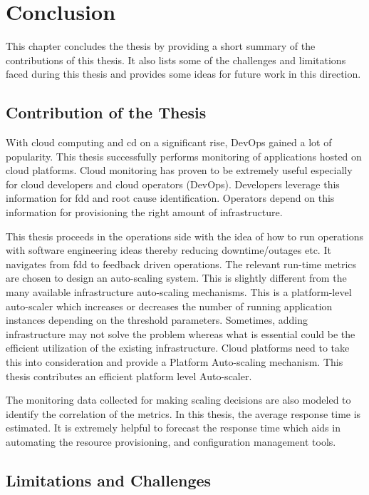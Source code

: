 \documentclass[article,type=msc,colorback,12pt,accentcolor=tud8b,table]{tudthesis}
\begin{document}
\cleardoublepage

 \hfill 
\section{Conclusion}	 
	 \hfill \break

This chapter concludes the thesis by providing a short summary of the contributions of this thesis. It also lists some of the challenges and limitations faced during this thesis and provides some ideas for future work in this direction.
 
\subsection{Contribution of the Thesis}

With cloud computing and \gls{cd} on a significant rise, DevOps gained a lot of popularity. This thesis successfully performs monitoring of applications hosted on cloud platforms. Cloud monitoring has proven to be extremely useful especially for cloud developers and cloud operators (DevOps). Developers leverage this information for \gls{fdd} and root cause identification. Operators depend on this information for provisioning the right amount of infrastructure.

This thesis proceeds in the operations side with the idea of how to run operations with software engineering ideas thereby reducing downtime/outages etc. It navigates from \gls{fdd} to feedback driven operations. The relevant run-time metrics are chosen to design an auto-scaling system. This is slightly different from the many available infrastructure auto-scaling mechanisms. This is a platform-level auto-scaler which increases or decreases the number of running application instances depending on the threshold parameters. Sometimes, adding infrastructure may not solve the problem whereas what is essential could be the efficient utilization of the existing infrastructure. Cloud platforms need to take this into consideration and provide a Platform Auto-scaling mechanism. This thesis contributes an efficient platform level Auto-scaler. 

The monitoring data collected for making scaling decisions are also modeled to identify the correlation of the metrics. In this thesis, the average response time is estimated. It is extremely helpful to forecast the response time which aids in automating the resource provisioning, and configuration management tools. 

 \subsection{Limitations and Challenges}	
 
\end{document}
